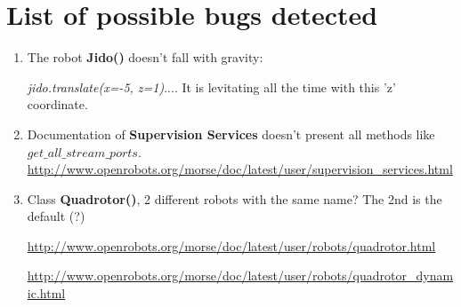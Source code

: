 \chapter*{List of possible bugs detected}

\begin{enumerate}
\item The robot \textbf{Jido()} doesn't fall with gravity:

\textit{jido.translate(x=-5, z=1)}.... It is levitating all the time with this 'z' coordinate.

\item Documentation of \textbf{Supervision Services} doesn't present all methods like \textit{$get\_all\_stream\_ports$}.
\url{http://www.openrobots.org/morse/doc/latest/user/supervision_services.html}

\item Class \textbf{Quadrotor()}, 2 different robots with the same name? The 2nd is the default (?)

\url{http://www.openrobots.org/morse/doc/latest/user/robots/quadrotor.html}

\url{http://www.openrobots.org/morse/doc/latest/user/robots/quadrotor_dynamic.html}



\end{enumerate}

